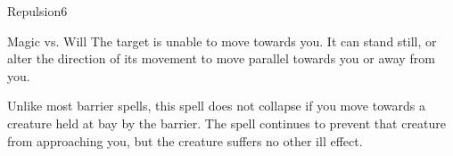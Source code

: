 \begin{spellsection}{Repulsion}{6}
\begin{spellheader}
\end{spellheader}
\begin{spellcontent}
    \begin{spelltargetinginfo}
    \end{spelltargetinginfo}
    \begin{spelleffects}
        \begin{spellattack}{Magic vs. Will}
            \spellsuccess The target is unable to move towards you. It can stand still, or alter the direction of its movement to move parallel towards you or away from you.
        \end{spellattack}
        \spelldur \durshort \dismissable
    \end{spelleffects}
\end{spellcontent}
\begin{spellfooter}
    \spellnotes Unlike most barrier spells, this spell does not collapse if you move towards a creature held at bay by the barrier. The spell continues to prevent that creature from approaching you, but the creature suffers no other ill effect.
\end{spellfooter}
\end{spellsection}

